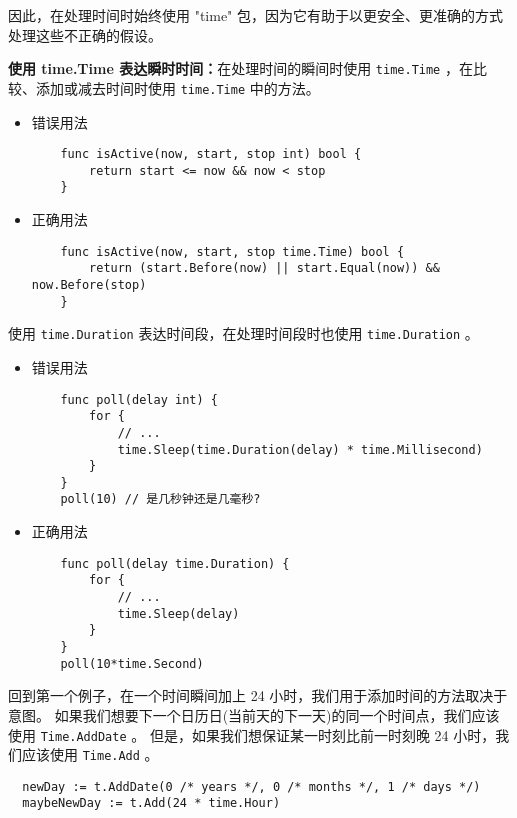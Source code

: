 因此，在处理时间时始终使用 "time" 包，因为它有助于以更安全、更准确的方式处理这些不正确的假设。

\textbf{使用 time.Time 表达瞬时时间：}在处理时间的瞬间时使用 \texttt{time.Time} ，在比较、添加或减去时间时使用 \texttt{time.Time} 中的方法。
\begin{itemize}[leftmargin=4em]
\item 错误用法

  \begin{verbatim}
    func isActive(now, start, stop int) bool {
    	return start <= now && now < stop
    }
  \end{verbatim}
\item 正确用法

  \begin{verbatim}
    func isActive(now, start, stop time.Time) bool {
    	return (start.Before(now) || start.Equal(now)) && now.Before(stop)
    }
  \end{verbatim}
\end{itemize}

使用 \texttt{time.Duration} 表达时间段，在处理时间段时也使用 \texttt{time.Duration} 。

\begin{itemize}[leftmargin=4em]
\item 错误用法

  \begin{verbatim}
    func poll(delay int) {
    	for {
    		// ...
    		time.Sleep(time.Duration(delay) * time.Millisecond)
    	}
    }
    poll(10) // 是几秒钟还是几毫秒?
  \end{verbatim}
\item 正确用法

  \begin{verbatim}
    func poll(delay time.Duration) {
    	for {
    		// ...
    		time.Sleep(delay)
    	}
    }
    poll(10*time.Second)
  \end{verbatim}
\end{itemize}

回到第一个例子，在一个时间瞬间加上 24 小时，我们用于添加时间的方法取决于意图。
如果我们想要下一个日历日(当前天的下一天)的同一个时间点，我们应该使用 \texttt{Time.AddDate} 。
但是，如果我们想保证某一时刻比前一时刻晚 24 小时，我们应该使用 \texttt{Time.Add} 。

\begin{verbatim}
  newDay := t.AddDate(0 /* years */, 0 /* months */, 1 /* days */)
  maybeNewDay := t.Add(24 * time.Hour)
\end{verbatim}

